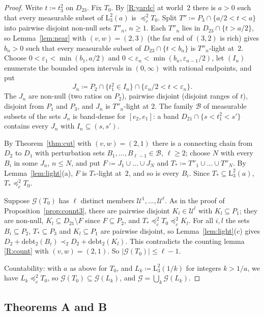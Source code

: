 \documentclass[11pt]{article}
\theoremstyle{definition}\newtheorem{definition}[theorem]{Definition}
\theoremstyle{remark}\newtheorem{remark}[theorem]{Remark}
\newcommand{\debt}{\mathrm{debt}}
\newcommand{\Uf}{\mathcal U}
\newcommand{\Bfam}{\mathcal B}
\newcommand{\Lo}[3]{\mathrm L^{#1}_{#2}(#3)}
\begin{document}
\begin{proof}
Write $t\coloneqq t^2_3$ on $D_{23}$. Fix $T_0$. By \ref{R:yardc} at
world~$2$ there is $a>0$ such that every measurable subset of $\Lo23a$ is
$\preceq^2_cT_0$. Split $T''\coloneqq P_3\cap\{a/2<t<a\}$ into pairwise
disjoint non-null sets $T''_n$, $n\ge1$. Each $T''_n$ lies in
$D_{23}\cap\{t>a/2\}$, so Lemma~\ref{lem:near} with $(v,w)=(2,3)$ (the far
end of $(3,2)$ is rich) gives $b_n>0$ such that every measurable subset of
$D_{23}\cap\{t<b_n\}$ is $T''_n$-light at~$2$. Choose $0<\varepsilon_1<\min(b_1,a/2)$
and $0<\varepsilon_n<\min(b_n,\varepsilon_{n-1}/2)$, let $(I_n)$ enumerate the bounded open
intervals in $(0,\infty)$ with rational endpoints, and put
\[
 J_n\coloneqq P_2\cap\{t^2_1\in I_n\}\cap\{\varepsilon_n/2<t<\varepsilon_n\}.
\]
The $J_n$ are non-null (two ratios on $P_2$), pairwise disjoint (disjoint
ranges of $t$), disjoint from $P_1$ and $P_3$, and $J_n$ is $T''_n$-light at
$2$. The family $\Bfam$ of measurable subsets of the sets $J_n$ is
band-dense for $[e_2,e_1]$: a band $D_{21}\cap\{s<t^2_1<s'\}$ contains every
$J_n$ with $I_n\subseteq(s,s')$.

By Theorem~\ref{thm:cut} with $(v,w)=(2,1)$ there is a connecting chain
from $D_2$ to $D_1$ with perturbation sets $B_1,\dots,B_{\ell-1}\in\Bfam$,
$\ell\ge2$; choose $N$ with every $B_i$ in some $J_n$, $n\le N$, and put
$F\coloneqq J_1\cup\dots\cup J_N$ and $T_*\coloneqq T''_1\cup\dots\cup
T''_N$. By Lemma~\ref{lem:light}(a), $F$ is $T_*$-light at~$2$, and so is
every $B_i$. Since $T_*\subseteq\Lo23a$, $T_*\preceq^2_cT_0$.

Suppose $\mathcal G(T_0)$ has $\ell$ distinct members $\Uf^1,\dots,
\Uf^\ell$. As in the proof of Proposition~\ref{prop:count3}, there are
pairwise disjoint $K_l\in\Uf^l$ with $K_l\subseteq P_1$; they are non-null,
$K_l\subseteq D_{21}\setminus F$ since $F\subseteq P_2$, and
$T_*\preceq^2_cT_0\preceq^2_cK_l$. For all $i,l$ the sets
$B_i\subseteq P_2$, $T_*\subseteq P_3$ and $K_l\subseteq P_1$ are pairwise
disjoint, so Lemma~\ref{lem:light}(c) gives
$D_2+\debt_2(B_i)\prec_2D_2+\debt_2(K_l)$. This contradicts the counting
lemma \ref{R:count} with $(v,w)=(2,1)$. So $|\mathcal G(T_0)|\le\ell-1$.

Countability: with $a$ as above for $T_0$, and $L_k\coloneqq\Lo23{1/k}$ for
integers $k>1/a$, we have $L_k\preceq^2_cT_0$, so
$\mathcal G(T_0)\subseteq\mathcal G(L_k)$, and
$\mathcal G=\bigcup_k\mathcal G(L_k)$.
\end{proof}

\subsection{Theorems A and B}\label{sec:AB}
\end{document}
